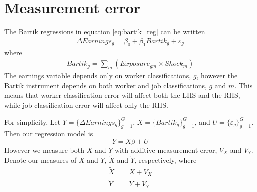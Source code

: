 \documentclass[12pt]{article}
\theoremstyle{definition}
\theoremstyle{plain}
\def\ve{\varepsilon}
\begin{document}




\section{Measurement error}


\label{app:misclassification}

\def\tx{\tilde X}
\def\ty{\tilde Y}

The Bartik regressions in equation \ref{eq:bartik_reg} can be written
\begin{align*}
	\Delta Earnings_g = \beta_0 + \beta_1 Bartik_g + \ve_g
\end{align*}
where
\begin{align*}
	Bartik_{g} = \sum_m \left( Exposure_{g m} \times Shock_m \right)
\end{align*}
The earnings variable depends only on worker classifications, $g$, however the Bartik instrument depends on both worker and job classifications, $g$ and $m$. This means that worker classification error will affect both the LHS and the RHS, while job classification error will affect only the RHS. 

For simplicity, Let $Y=\{\Delta Earnings_g\}_{g=1}^G$, $X=\{Bartik_g\}_{g=1}^G$, and $U=\{\ve_g\}_{g=1}^G$. Then our regression model is 
\[ Y = X \beta + U\]
However we measure both $X$ and $Y$ with additive measurement error, $V_X$ and $V_Y$. Denote our measures of $X$ and $Y$, $\tilde X$ and $\tilde Y$, respectively, where
\begin{align*}
	\tx &= X + V_X \\
	\ty &= Y + V_Y 
\end{align*}
\end{document}
